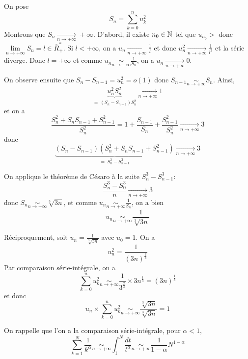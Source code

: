 \begin{solution}
	On pose 
	$$S_{n}=\sum_{k=0}^{n}u_{k}^{2}$$
	Montrons que $S_{n}\xrightarrow[n\to+\infty]{}+\infty$. D'abord, il existe $n_{0}\in\mathbb{N}$ tel que $u_{n_{0}}>$ donc $\lim\limits_{n\to+\infty}S_{n}=l\in\overline{R}_{+}^{*}$. Si $l<+\infty$, on a $u_{n}\xrightarrow[n\to+\infty]{}\frac{1}{l}$ et donc $u_{n}^{2}\xrightarrow[n\to+\infty]{}\frac{1}{l^{2}}$ et la série diverge. Donc $l=+\infty$ et comme $u_{n}\underset{n\to+\infty}{\sim}\frac{1}{S_{n}}$, on a $u_{n}\xrightarrow[n\to+\infty]{}0$.

	On observe ensuite que $S_{n}-S_{n-1}=u_{n}^{2}=o(1)$ donc $S_{n-1}\underset{n\to+\infty}{\sim}S_{n}$. Ainsi, 
	$$\underbrace{u_{n}^{2}S_{n}^{2}}_{=~(S_{n}-S_{n-1})S_{n}^{2}}\xrightarrow[n\to+\infty]{}1$$
	et on a 
	$$\frac{S_{n}^{2}+S_{n}S_{n-1}+S_{n-1}^{2}}{S_{n}^{2}}=1+\frac{S_{n-1}}{S_{n}}+\frac{S_{n-1}^{2}}{S_{n}^{2}}\xrightarrow[n\to+\infty]{}3$$
	donc 
	$$\underbrace{(S_{n}-S_{n-1})(S_{n}^{2}+S_{n}S_{n-1}+S_{n-1}^{2})}_{=~S_{n}^{3}-S_{n-1}^{3}}\xrightarrow[n\to+\infty]{}3$$

	On applique le théorème de Césaro à la suite $S_{n}^{3}-S_{n-1}^{3}$:
	$$\frac{S_{n}^{3}-S_{0}^{3}}{n}\xrightarrow[n\to+\infty]{}3$$
	donc $S_{n}\underset{n\to+\infty}{\sim}\sqrt[3]{3n}$, et comme $u_{n}\underset{n\to+\infty}{\sim}\frac{1}{S_{n}}$, on a bien 
	$$\boxed{u_{n}\underset{n\to+\infty}{\sim}\frac{1}{\sqrt[3]{3n}}}$$

	Réciproquement, soit $u_{n}=\frac{1}{\sqrt[3]{3n}}$ avec $u_{0}=1$. On a 
	$$u_{n}^{2}=\frac{1}{(3n)^{\frac{2}{3}}}$$
	Par comparaison série-intégrale, on a 
	$$\sum_{k=0}^{n}u_{k}^{2}\underset{n\to+\infty}{\sim}\frac{1}{3^{\frac{2}{3}}}\times 3n^{\frac{1}{3}}=(3n)^{\frac{1}{3}}$$
	et donc 
	$$\boxed{u_{n}\times\sum_{k=0}^{n}u_{k}^{2}\underset{n\to+\infty}{\sim}\frac{\sqrt[3]{3n}}{\sqrt[3]{3n}}=1}$$
\end{solution}

\begin{remark}
	On rappelle que l'on a la comparaison série-intégrale, pour $\alpha<1$,
	$$\sum_{k=1}^{N}\frac{1}{k^{\alpha}}\underset{n\to+\infty}{\sim}\int_{1}^{N}\frac{dt}{t^{\alpha}}\underset{n\to+\infty}{\sim}\frac{1}{1-\alpha}N^{1-\alpha}$$
\end{remark}

